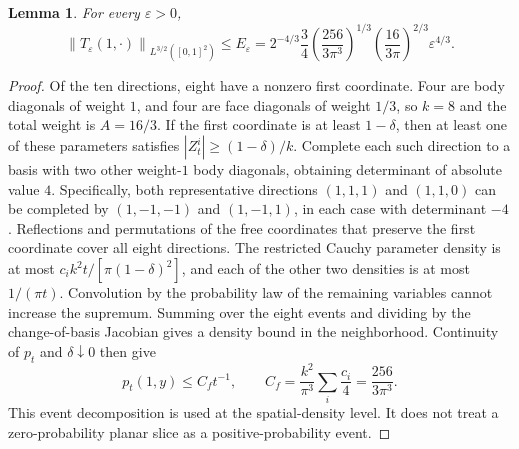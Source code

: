 \documentclass[11pt,a4paper]{article}
\newtheorem{lemma}[theorem]{Lemma}
\theoremstyle{definition}\newtheorem{definition}[theorem]{Definition}
\theoremstyle{remark}\newtheorem{remark}[theorem]{Remark}
\newcommand{\norm}[1]{\left\lVert#1\right\rVert}
\newcommand{\abs}[1]{\left|#1\right|}
\begin{document}
\begin{lemma}\label{lem:shorttime}
For every $\varepsilon>0$,
\begin{equation}\label{eq:time}
 \norm{T_\varepsilon(1,\cdot)}_{L^{3/2}([0,1]^2)}
 \le E_\varepsilon
 =2^{-4/3}\frac34
 \left(\frac{256}{3\pi^3}\right)^{1/3}
 \left(\frac{16}{3\pi}\right)^{2/3}\varepsilon^{4/3}.
\end{equation}
\end{lemma}
\begin{proof}
Of the ten directions, eight have a nonzero first coordinate. Four are body diagonals of weight $1$, and four are face diagonals of weight $1/3$, so $k=8$ and the total weight is $A=16/3$. If the first coordinate is at least $1-\delta$, then at least one of these parameters satisfies $\abs{Z_t^i}\ge(1-\delta)/k$. Complete each such direction to a basis with two other weight-$1$ body diagonals, obtaining determinant of absolute value $4$. Specifically, both representative directions $(1,1,1)$ and $(1,1,0)$ can be completed by $(1,-1,-1)$ and $(1,-1,1)$, in each case with determinant $-4$. Reflections and permutations of the free coordinates that preserve the first coordinate cover all eight directions. The restricted Cauchy parameter density is at most $c_ik^2t/[\pi(1-\delta)^2]$, and each of the other two densities is at most $1/(\pi t)$. Convolution by the probability law of the remaining variables cannot increase the supremum. Summing over the eight events and dividing by the change-of-basis Jacobian gives a density bound in the neighborhood. Continuity of $p_t$ and $\delta\downarrow0$ then give
\begin{equation}\label{eq:face-sup}
 p_t(1,y)\le C_ft^{-1},\qquad
 C_f=\frac{k^2}{\pi^3}\sum_i\frac{c_i}{4}
     =\frac{256}{3\pi^3}.
\end{equation}
This event decomposition is used at the spatial-density level. It does not treat a zero-probability planar slice as a positive-probability event.


\end{proof}
\end{document}
